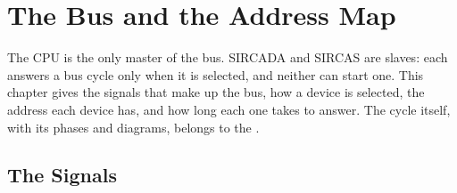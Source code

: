 \chapter{The Bus and the Address Map}
\label{ch:bus-and-address-map}

The CPU is the only master of the bus. SIRCADA and SIRCAS are slaves: each answers a bus cycle only when it is
selected, and neither can start one. This chapter gives the signals that make up the bus, how a device is selected, the
address each device has, and how long each one takes to answer. The cycle itself, with its phases and diagrams, belongs
to the \hwmanual{}.

\section{The Signals}
\label{sec:bus-signals}

